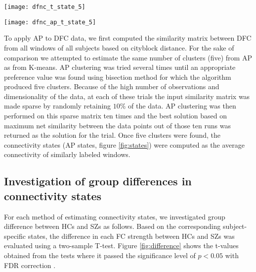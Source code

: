 \documentclass{article}
\begin{document}
\begin{figure*}
  \centering
  \centerline{\texttt{[image: dfnc\_t\_state\_5]}}
  \centerline{\texttt{[image: dfnc\_ap\_t\_state\_5]}}
  \caption{\ac{HC} vs \ac{SZ} group difference in \ac{DFC} connectivity states estimated by two separate clustering methods. 2-sample T-tests were performed on each connectivity mean strengths of \acp{HC} and \acp{SZ} to obtain group difference. t-values are shown for connectivity where $p<0.05$ (FDR corrected). \acp{HC} show significantly higher connectivity strength than \acp{SZ} where t-values are positive (red) and the opposite when it is negative (blue).}
  \label{fig:difference}
\end{figure*}

To apply \ac{AP} to \ac{DFC} data, we first computed the similarity matrix between \ac{DFC} from all windows of all subjects based on cityblock distance. For the sake of comparison we attempted to estimate the same number of clusters (five) from \ac{AP} as from K-means. \ac{AP} clustering was tried several times until an appropriate preference value was found using bisection method for which the algorithm produced five clusters. Because of the high number of observations and dimensionality of the data, at each of these trials the input similarity matrix was made sparse by randomly retaining $10\%$ of the data. \ac{AP} clustering was then performed on this sparse matrix ten times and the best solution based on maximum net similarity between the data points out of those ten runs was returned as the solution for the trial. Once five clusters were found, the connectivity states (\ac{AP} states, figure \ref{fig:states}) were computed as the average connectivity of similarly labeled windows.

\vfill\pagebreak

\subsection{Investigation of group differences in connectivity states}
\label{sec:GroupD}

For each method of estimating connectivity states, we investigated group difference between \acp{HC} and \acp{SZ} as follows. Based on the corresponding subject-specific states, the difference in each \ac{FC} strength between \acp{HC} and \acp{SZ} was evaluated using a two-sample T-test. Figure \ref{fig:difference} shows the t-values obtained from the tests where it passed the significance level of $p<0.05$ with \ac{FDR} correction \cite{benjamini_controlling_1995}. 
\end{document}
